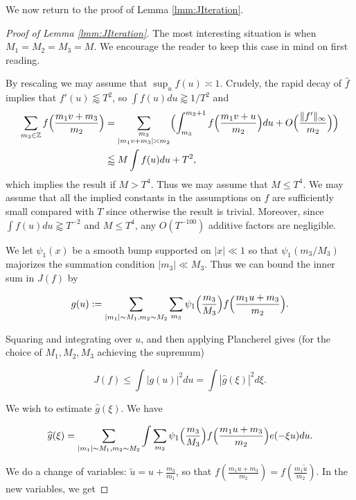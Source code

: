 \documentclass{amsart}
\theoremstyle{plain}
\numberwithin{equation}{section}
\renewcommand{\tilde}{\widetilde}
\begin{document}
%
%

We now return to the proof of Lemma \ref{lmm:JIteration}.

\begin{proof}[Proof of  Lemma \ref{lmm:JIteration}]
The most interesting situation is when $M_1 = M_2 = M_3 = M$.  We encourage the reader to keep this case in mind on first reading. 

By rescaling we may assume that $\sup_u f(u)\asymp 1$. Crudely, the rapid decay of $\widehat{f}$ implies that $f'(u)\lessapprox T^2$, so $\int f(u)du\gtrapprox 1/T^2$ and
\begin{align*}
\sum_{m_3\in\mathbb{Z} }f\Bigl(\frac{m_1v+m_3}{m_2}\Bigr)&=\sum_{\substack{m_3\\ |m_1v+m_3|\asymp m_2}}\Bigl(\int_{m_3}^{m_3+1}f\Bigl(\frac{m_1v+u}{m_2}\Bigr)du+O\Bigl(\frac{\|f'\|_\infty}{m_2}\Bigr)\Bigr)\\
 &\lessapprox M\int f(u)du+T^2,
\end{align*}
which implies the result if $M>T^4$. Thus we may assume that $M\le T^{4}$. We may assume that all the implied constants in the assumptions on $f$ are sufficiently small compared with $T$ since otherwise the result is trivial. Moreover, since $\int f(u)du\gtrapprox T^{-2}$ and $M\le T^4$, any $O(T^{-100})$ additive factors are negligible. 

We let $\psi_1(x)$ be a smooth bump supported on $|x| \ll 1$ so that $\psi_1(m_3/M_3)$ majorizes the summation condition $|m_3|\ll M_3$.   Thus we can bound the inner sum in $J(f)$ by

\[
 g(u) :=  \sum_{|m_1| \sim M_1, m_2 \sim M_2} \sum_{m_3 }  \psi_1\Bigl(\frac{m_3}{M_3}\Bigr) f \Big( \frac{m_1 u + m_3}{m_2}  \Big). 
 \]

Squaring and integrating over $u$, and then applying Plancherel gives (for the choice of $M_1,M_2,M_3$ achieving the supremum)

\begin{equation}
J(f)\le \int |g(u)|^2 du=\int |\widehat{g}(\xi)|^2 d\xi.
 \label{eq:FourierInt}
\end{equation}

We wish to estimate $\widehat{g}(\xi)$.  We have

\[ \widehat{g}(\xi) =   \sum_{|m_1| \sim M_1, m_2 \sim M_2} \int \sum_{m_3 } \psi_1\Bigl(\frac{m_3}{M_3}\Bigr) f \Big( \frac{m_1 u + m_3}{m_2}  \Big) e(- \xi u) du.  \]

We do a change of variables: $\tilde{u} = u  + \frac{m_3}{m_1}$, so that $f( \frac{m_1 u + m_3}{m_2} ) = f( \frac{m_1 \tilde{u}}{m_2})$.  In the new variables, we get


\end{proof}
\end{document}
